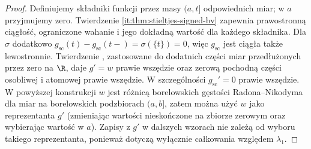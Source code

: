 \begin{proof}
Definiujemy składniki funkcji przez masy $(a,t]$
odpowiednich miar; w $a$ przyjmujemy zero.
Twierdzenie \ref{it:thm:stieltjes-signed-bv} zapewnia
prawostronną ciągłość, ograniczone wahanie i jego dokładną
wartość dla każdego składnika. Dla $\sigma$ dodatkowo
$g_{\mathrm{sc}}(t)-g_{\mathrm{sc}}(t-)=\sigma(\{t\})=0$,
więc $g_{\mathrm{sc}}$ jest ciągła także lewostronnie.
Twierdzenie , zastosowane
do dodatnich części miar przedłużonych przez zero na
$\R$, daje $g'=w$ prawie wszędzie oraz zerową pochodną
części osobliwej i atomowej prawie wszędzie.
W szczególności $g_{\mathrm{sc}}'=0$ prawie wszędzie.
W powyższej konstrukcji $w$ jest różnicą borelowskich
gęstości Radona--Nikodyma dla miar na borelowskich
podzbiorach $(a,b]$, zatem można użyć $w$ jako
reprezentanta $g'$ (zmieniając wartości nieskończone
na zbiorze zerowym oraz wybierając wartość w $a$).
Zapisy z $g'$ w dalszych wzorach nie zależą od
wyboru takiego reprezentanta, ponieważ dotyczą
wyłącznie całkowania względem $\lambda_1$.


\end{proof}
